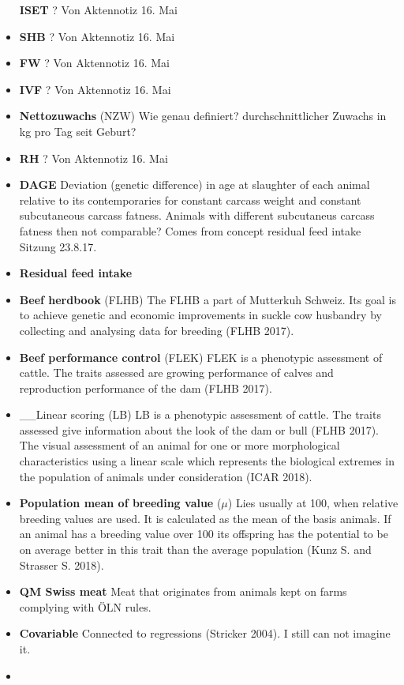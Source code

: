 \documentclass[]{article}
\begin{document}
\begin{itemize}
  \textbf{ISET} ? Von Aktennotiz 16. Mai
\item
  \textbf{SHB} ? Von Aktennotiz 16. Mai
\item
  \textbf{FW} ? Von Aktennotiz 16. Mai
\item
  \textbf{IVF} ? Von Aktennotiz 16. Mai
\item
  \textbf{Nettozuwachs} (NZW) Wie genau definiert? durchschnittlicher
  Zuwachs in kg pro Tag seit Geburt?
\item
  \textbf{RH} ? Von Aktennotiz 16. Mai
\item
  \textbf{DAGE} Deviation (genetic difference) in age at slaughter of
  each animal relative to its contemporaries for constant carcass weight
  and constant subcutaneous carcass fatness. Animals with different
  subcutaneus carcass fatness then not comparable? Comes from concept
  residual feed intake Sitzung 23.8.17.
\item
  \textbf{Residual feed intake}
\item
  \textbf{Beef herdbook} (FLHB) The FLHB a part of Mutterkuh Schweiz.
  Its goal is to achieve genetic and economic improvements in suckle cow
  husbandry by collecting and analysing data for breeding (FLHB 2017).
\item
  \textbf{Beef performance control} (FLEK) FLEK is a phenotypic
  assessment of cattle. The traits assessed are growing performance of
  calves and reproduction performance of the dam (FLHB 2017).
\item
  \_\_Linear scoring (LB) LB is a phenotypic assessment of cattle. The
  traits assessed give information about the look of the dam or bull
  (FLHB 2017). The visual assessment of an animal for one or more
  morphological characteristics using a linear scale which represents
  the biological extremes in the population of animals under
  consideration (ICAR 2018).
\item
  \textbf{Population mean of breeding value} (\(\mu\)) Lies usually at
  100, when relative breeding values are used. It is calculated as the
  mean of the basis animals. If an animal has a breeding value over 100
  its offspring has the potential to be on average better in this trait
  than the average population (Kunz S. and Strasser S. 2018).
\item
  \textbf{QM Swiss meat} Meat that originates from animals kept on farms
  complying with ÖLN rules.
\item
  \textbf{Covariable} Connected to regressions (Stricker 2004). I still
  can not imagine it.
\item

\end{itemize}
\end{document}
